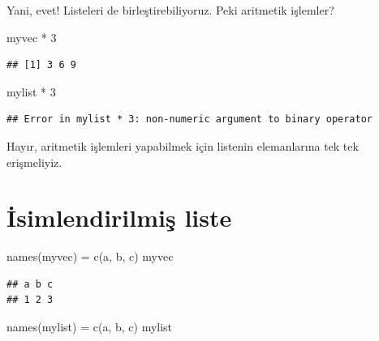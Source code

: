 \documentclass[
]{book}
\newenvironment{Shaded}{\begin{snugshade}}{\end{snugshade}}
\newcommand{\DecValTok}[1]{\textcolor[rgb]{0.00,0.00,0.81}{#1}}
\newcommand{\FunctionTok}[1]{\textcolor[rgb]{0.00,0.00,0.00}{#1}}
\newcommand{\NormalTok}[1]{#1}
\newcommand{\OtherTok}[1]{\textcolor[rgb]{0.56,0.35,0.01}{#1}}
\newcommand{\SpecialCharTok}[1]{\textcolor[rgb]{0.00,0.00,0.00}{#1}}
\newcommand{\StringTok}[1]{\textcolor[rgb]{0.31,0.60,0.02}{#1}}
\begin{document}
Yani, evet! Listeleri de birleştirebiliyoruz. Peki aritmetik işlemler?

\begin{Shaded}
\begin{Highlighting}[]
\NormalTok{myvec }\SpecialCharTok{*} \DecValTok{3}
\end{Highlighting}
\end{Shaded}

\begin{verbatim}
## [1] 3 6 9
\end{verbatim}

\begin{Shaded}
\begin{Highlighting}[]
\NormalTok{mylist }\SpecialCharTok{*} \DecValTok{3}
\end{Highlighting}
\end{Shaded}

\begin{verbatim}
## Error in mylist * 3: non-numeric argument to binary operator
\end{verbatim}

Hayır, aritmetik işlemleri yapabilmek için listenin elemanlarına tek tek erişmeliyiz.

\hypertarget{isimlendirilmiux15f-liste}{%
\section{İsimlendirilmiş liste}\label{isimlendirilmiux15f-liste}}

\begin{Shaded}
\begin{Highlighting}[]
\FunctionTok{names}\NormalTok{(myvec) }\OtherTok{=} \FunctionTok{c}\NormalTok{(}\StringTok{\textquotesingle{}a\textquotesingle{}}\NormalTok{, }\StringTok{\textquotesingle{}b\textquotesingle{}}\NormalTok{, }\StringTok{\textquotesingle{}c\textquotesingle{}}\NormalTok{)}
\NormalTok{myvec}
\end{Highlighting}
\end{Shaded}

\begin{verbatim}
## a b c 
## 1 2 3
\end{verbatim}

\begin{Shaded}
\begin{Highlighting}[]
\FunctionTok{names}\NormalTok{(mylist) }\OtherTok{=} \FunctionTok{c}\NormalTok{(}\StringTok{\textquotesingle{}a\textquotesingle{}}\NormalTok{, }\StringTok{\textquotesingle{}b\textquotesingle{}}\NormalTok{, }\StringTok{\textquotesingle{}c\textquotesingle{}}\NormalTok{)}
\NormalTok{mylist}
\end{Highlighting}
\end{Shaded}
\end{document}
